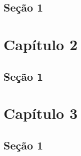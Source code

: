 \documentclass[12pt, a4paper]{report}
\begin{document}
\section{Seção 1}



\chapter{Capítulo 2}
	

\section{Seção 1}


\chapter{Capítulo 3}
	

\section{Seção 1}




\nocite{Lucas1, Lucas2, Bonola}


\newpage
\renewcommand{\refname}{Referências Bibliográficas}

\end{document}
